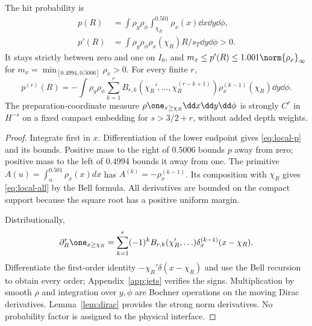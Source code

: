 \begin{theorem}\label{thm:local-hit}
The hit probability is
\begin{align}
 p(R)&=\int\rho_y\rho_\phi\int_{\chi_R}^{0.501}\rho_x(x)\dd x\dd y\dd\phi,\\
 p'(R)&=\int\rho_y\rho_\phi\rho_x(\chi_R)R/s_T\dd y\dd\phi>0.
 \label{eq:local-p}
\end{align}
It stays strictly between zero and one on $I_0$, and
$m_x\le p'(R)\le1.001\norm{\rho_x}_\infty$ for
$m_x=\min_{[0.4994,0.5006]}\rho_x>0$. For every finite $r$,
\begin{equation}
 p^{(r)}(R)=-\int\rho_y\rho_\phi
 \sum_{k=1}^rB_{r,k}(\chi_R',\ldots,\chi_R^{(r-k+1)})
 \rho_x^{(k-1)}(\chi_R)\dd y\dd\phi.
 \label{eq:local-all}
\end{equation}
The preparation-coordinate measure $\rho\one_{x\ge\chi_R}\dd x\dd y\dd\phi$ is strongly $C^r$ in $H^{-s}$ on a fixed compact embedding for $s>3/2+r$, without added depth weights.
\end{theorem}
\begin{proof}
Integrate first in $x$. Differentiation of the lower endpoint gives \eqref{eq:local-p} and its bounds. Positive mass to the right of $0.5006$ bounds $p$ away from zero; positive mass to the left of $0.4994$ bounds it away from one. The primitive $A(u)=\int_u^{0.501}\rho_x(x)dx$ has $A^{(k)}=-\rho_x^{(k-1)}$. Its composition with $\chi_R$ gives \eqref{eq:local-all} by the Bell formula. All derivatives are bounded on the compact support because the square root has a positive uniform margin.

Distributionally,
\begin{equation}
 \partial_R^r\one_{x\ge\chi_R}
 =\sum_{k=1}^r(-1)^kB_{r,k}(\chi_R',\ldots)\delta_x^{(k-1)}(x-\chi_R).
 \label{eq:local-current}
\end{equation}
Differentiate the first-order identity $-\chi_R'\delta(x-\chi_R)$ and use the Bell recursion to obtain every order; Appendix~\ref{app:jets} verifies the signs. Multiplication by smooth $\rho$ and integration over $y,\phi$ are Bochner operations on the moving Dirac derivatives. Lemma~\ref{lem:dirac} provides the strong norm derivatives. No probability factor is assigned to the physical interface.
\end{proof}

